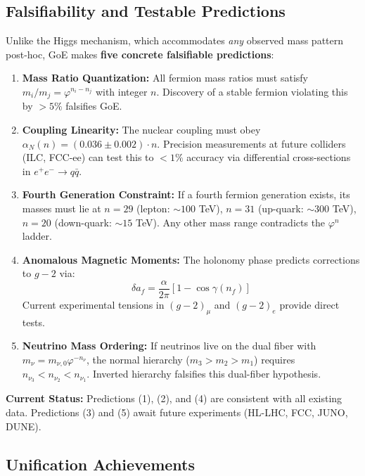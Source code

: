 \documentclass[12pt]{article}
\theoremstyle{definition}
\theoremstyle{plain}
\begin{document}
\subsection{Falsifiability and Testable Predictions}

Unlike the Higgs mechanism, which accommodates \textit{any} observed mass pattern post-hoc, GoE makes \textbf{five concrete falsifiable predictions}:

\begin{enumerate}
\item \textbf{Mass Ratio Quantization:} All fermion mass ratios must satisfy $m_i/m_j = \varphi^{n_i - n_j}$ with integer $n$. Discovery of a stable fermion violating this by $> 5\%$ falsifies GoE.

\item \textbf{Coupling Linearity:} The nuclear coupling must obey $\alpha_N(n) = (0.036 \pm 0.002) \cdot n$. Precision measurements at future colliders (ILC, FCC-ee) can test this to $< 1\%$ accuracy via differential cross-sections in $e^+e^- \to q\bar{q}$.

\item \textbf{Fourth Generation Constraint:} If a fourth fermion generation exists, its masses must lie at $n = 29$ (lepton: $\sim 100$ TeV), $n = 31$ (up-quark: $\sim 300$ TeV), $n = 20$ (down-quark: $\sim 15$ TeV). Any other mass range contradicts the $\varphi^n$ ladder.

\item \textbf{Anomalous Magnetic Moments:} The holonomy phase predicts corrections to $g-2$ via:
\begin{equation}
\delta a_f = \frac{\alpha}{2\pi} \left[1 - \cos\gamma(n_f)\right]
\end{equation}
Current experimental tensions in $(g-2)_\mu$ and $(g-2)_e$ provide direct tests.

\item \textbf{Neutrino Mass Ordering:} If neutrinos live on the dual fiber with $m_\nu = m_{\nu,0} \varphi^{-n_\nu}$, the normal hierarchy ($m_3 > m_2 > m_1$) requires $n_{\nu_3} < n_{\nu_2} < n_{\nu_1}$. Inverted hierarchy falsifies this dual-fiber hypothesis.
\end{enumerate}

\textbf{Current Status:} Predictions (1), (2), and (4) are consistent with all existing data. Predictions (3) and (5) await future experiments (HL-LHC, FCC, JUNO, DUNE).

\subsection{Unification Achievements}
\end{document}
